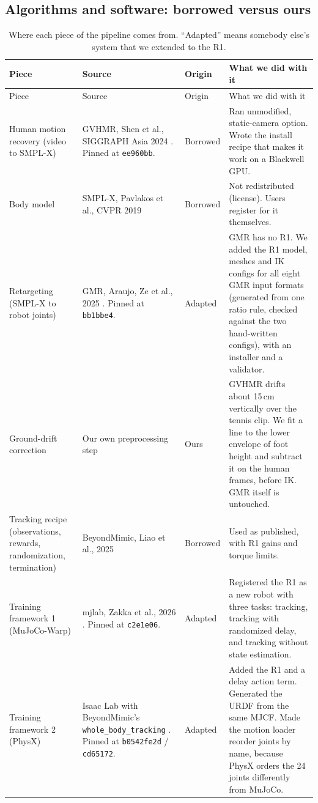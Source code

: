 \documentclass[11pt]{article}
\newcommand{\code}[1]{\texttt{#1}}
\begin{document}
\subsection{Algorithms and software: borrowed versus ours}
{\small
\begin{longtable}{@{}p{2.5cm}p{3.5cm}p{1.5cm}p{7.4cm}@{}}
\caption{Where each piece of the pipeline comes from. ``Adapted'' means somebody else's system that we extended to the R1.}\label{tab:sources}\\
\toprule
Piece & Source & Origin & What we did with it\\
\midrule
\endfirsthead
\toprule
Piece & Source & Origin & What we did with it\\
\midrule
\endhead
Human motion recovery (video to SMPL-X) & GVHMR, Shen et al., SIGGRAPH Asia 2024 \cite{gvhmr}. Pinned at \code{ee960bb}. & Borrowed & Ran unmodified, static-camera option. Wrote the install recipe that makes it work on a Blackwell GPU.\\
Body model & SMPL-X, Pavlakos et al., CVPR 2019 \cite{smplx} & Borrowed & Not redistributed (license). Users register for it themselves.\\
Retargeting (SMPL-X to robot joints) & GMR, Araujo, Ze et al., 2025 \cite{gmr,gmrsoft}. Pinned at \code{bb1bbe4}. & Adapted & GMR has no R1. We added the R1 model, meshes and IK configs for all eight GMR input formats (generated from one ratio rule, checked against the two hand-written configs), with an installer and a validator.\\
Ground-drift correction & Our own preprocessing step & Ours & GVHMR drifts about 15\,cm vertically over the tennis clip. We fit a line to the lower envelope of foot height and subtract it on the human frames, before IK. GMR itself is untouched.\\
Tracking recipe (observations, rewards, randomization, termination) & BeyondMimic, Liao et al., 2025 \cite{beyondmimic} & Borrowed & Used as published, with R1 gains and torque limits.\\
Training framework 1 (MuJoCo-Warp) & mjlab, Zakka et al., 2026 \cite{mjlab}. Pinned at \code{c2e1e06}. & Adapted & Registered the R1 as a new robot with three tasks: tracking, tracking with randomized delay, and tracking without state estimation.\\
Training framework 2 (PhysX) & Isaac Lab \cite{isaaclab} with BeyondMimic's \code{whole\_body\_tracking} \cite{wbt}. Pinned at \code{b0542fe2d} / \code{cd65172}. & Adapted & Added the R1 and a delay action term. Generated the URDF from the same MJCF. Made the motion loader reorder joints by name, because PhysX orders the 24 joints differently from MuJoCo.\\

\end{longtable}}
\end{document}

